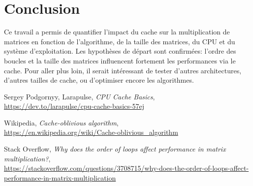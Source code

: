 \documentclass[a4paper,12pt]{article}
\begin{document}
\section{Conclusion}

Ce travail a permis de quantifier l'impact du cache sur la multiplication de matrices
en fonction de l'algorithme, de la taille des matrices, du CPU et du système d'exploitation. 
Les hypothèses de départ sont confirmées: l'ordre des boucles et la taille des matrices 
influencent fortement les performances via le cache. Pour aller plus loin, 
il serait intéressant de tester d'autres architectures, d'autres tailles de cache, 
ou d'optimiser encore les algorithmes.

\newpage

\begin{thebibliography}{9}

Sergey Podgornyy, Larapulse, \textit{CPU Cache Basics},\\
\url{https://dev.to/larapulse/cpu-cache-basics-57ej}

Wikipedia, \textit{Cache-oblivious algorithm},\\
\url{https://en.wikipedia.org/wiki/Cache-oblivious_algorithm}

Stack Overflow, \textit{Why does the order of loops affect performance in matrix multiplication?},\\
\url{https://stackoverflow.com/questions/3708715/why-does-the-order-of-loops-affect-performance-in-matrix-multiplication}
\end{thebibliography}
\end{document}
